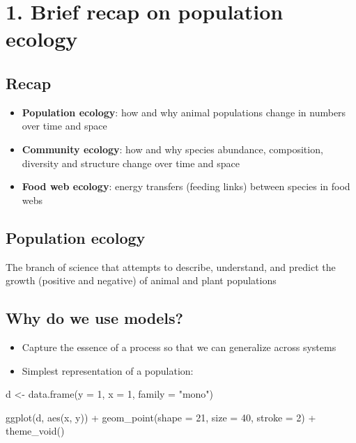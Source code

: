 \documentclass[
  letterpaper,
  DIV=11,
  numbers=noendperiod]{scrartcl}
\newenvironment{Shaded}{\begin{snugshade}}{\end{snugshade}}
\newcommand{\AttributeTok}[1]{\textcolor[rgb]{0.40,0.45,0.13}{#1}}
\newcommand{\DecValTok}[1]{\textcolor[rgb]{0.68,0.00,0.00}{#1}}
\newcommand{\FunctionTok}[1]{\textcolor[rgb]{0.28,0.35,0.67}{#1}}
\newcommand{\NormalTok}[1]{\textcolor[rgb]{0.00,0.23,0.31}{#1}}
\newcommand{\OtherTok}[1]{\textcolor[rgb]{0.00,0.23,0.31}{#1}}
\newcommand{\SpecialCharTok}[1]{\textcolor[rgb]{0.37,0.37,0.37}{#1}}
\newcommand{\StringTok}[1]{\textcolor[rgb]{0.13,0.47,0.30}{#1}}
\begin{document}
\hypertarget{brief-recap-on-population-ecology}{%
\section{1. Brief recap on population
ecology}\label{brief-recap-on-population-ecology}}

\hypertarget{recap}{%
\subsection{Recap}\label{recap}}

\begin{itemize}
\item
  \textbf{Population ecology}: how and why animal populations change in
  numbers over time and space
\item
  \textbf{Community ecology}: how and why species abundance,
  composition, diversity and structure change over time and space
\item
  \textbf{Food web ecology}: energy transfers (feeding links) between
  species in food webs
\end{itemize}

\hypertarget{population-ecology}{%
\subsection{Population ecology}\label{population-ecology}}

The branch of science that attempts to describe, understand, and predict
the growth (positive and negative) of animal and plant populations

\hypertarget{why-do-we-use-models}{%
\subsection{Why do we use models?}\label{why-do-we-use-models}}

\begin{itemize}
\item
  Capture the essence of a process so that we can generalize across
  systems
\item
  Simplest representation of a population:
\end{itemize}

\begin{Shaded}
\begin{Highlighting}[]
\NormalTok{d }\OtherTok{\textless{}{-}} \FunctionTok{data.frame}\NormalTok{(}\AttributeTok{y =} \DecValTok{1}\NormalTok{, }\AttributeTok{x =} \DecValTok{1}\NormalTok{, }\AttributeTok{family =} \StringTok{"mono"}\NormalTok{)}

\FunctionTok{ggplot}\NormalTok{(d, }\FunctionTok{aes}\NormalTok{(x, y)) }\SpecialCharTok{+}
  \FunctionTok{geom\_point}\NormalTok{(}\AttributeTok{shape =} \DecValTok{21}\NormalTok{, }\AttributeTok{size =} \DecValTok{40}\NormalTok{, }\AttributeTok{stroke =} \DecValTok{2}\NormalTok{) }\SpecialCharTok{+}
  \FunctionTok{theme\_void}\NormalTok{()}
\end{Highlighting}
\end{Shaded}
\end{document}
